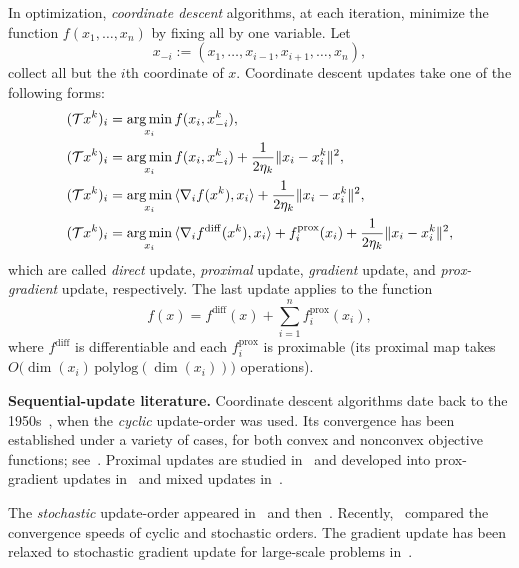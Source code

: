 In optimization,  \emph{coordinate descent} algorithms, at each iteration, minimize the function $f(x_1,\ldots,x_n)$ by fixing all by one variable. Let $$x_{-i}:=(x_1,\ldots,x_{i-1},x_{i+1},\ldots,x_n),$$
collect all but the $i$th coordinate of $x$. Coordinate descent updates take one of the following forms:
\begin{subequations}\label{coordes}
\begin{align}
(\cT x^k)_i & = \argmin_{x_i}f(x_i,x_{-i}^k),\\
(\cT x^k)_i & = \argmin_{x_i}f(x_i,x_{-i}^k)+\frac{1}{2\eta_k}\|x_i-x_i^k\|^2,\\
(\cT x^k)_i & = \argmin_{x_i}\,\langle \nabla_i f(x^k),x_i \rangle+\frac{1}{2\eta_k}\|x_i-x_i^k\|^2,\\
(\cT x^k)_i & = \argmin_{x_i}\,\langle \nabla_i f^{\mathrm{diff}}(x^k),x_i \rangle+f_i^{\mathrm{prox}}(x_i)+\frac{1}{2\eta_k}\|x_i-x_i^k\|^2,
\end{align}
\end{subequations}
which are called \emph{direct} update, \emph{proximal} update,  \emph{gradient} update, and \emph{prox-gradient} update, respectively. The last update applies to the function $$f(x) = f^{\mathrm{diff}}(x)+\sum_{i=1}^nf^{\mathrm{prox}}_i(x_i),$$ where $f^{\mathrm{diff}}$ is differentiable and each $f^{\mathrm{prox}}_i$ is proximable (its proximal map takes $O\big(\dim(x_i)\,\mathrm{polylog}(\dim(x_i))\big)$ operations).


\textbf{Sequential-update literature.} Coordinate descent algorithms date back to the 1950s~\cite{hildreth1957quadprog}, when the \emph{cyclic} update-order was used. Its convergence has been established under a variety of cases, for both convex and nonconvex objective functions; see~\cite{Warga-63,zadeh1970note, Sargent-Sebastian-73,Han-88,luo1992convergence, Tseng-93, Grippo-Sciandrone-00, Tseng-01, razaviyayn2013unified, beck2013convergence, hong2015iteration, wright2015coordinate}. Proximal updates are studied in~\cite{Grippo-Sciandrone-00, attouch2010proximal} and developed into prox-gradient updates in~\cite{tseng2009_CGD, tseng2009block-linear, bolte2014proximal} and mixed updates in~\cite{XY_2013_multiblock}.

The \emph{stochastic} update-order appeared in~\cite{nesterov2012cd} and then~\cite{richtarik2014iteration, Lu_Xiao_rbcd_2015}. Recently,~\cite{XY_2014_ecd,Xu2015_APG_NTD} compared the convergence speeds of cyclic and stochastic orders. The gradient update has been relaxed to  stochastic gradient update for large-scale problems in~\cite{DangLan-SBMD, XY_2015_bsg}. 

